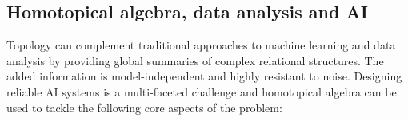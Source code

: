%
%

\subsection{Homotopical algebra, data analysis and AI} \label{ss:ai}

Topology can complement traditional approaches to machine learning and data analysis by providing global summaries of complex relational structures.
The added information is model-independent and highly resistant to noise.
Designing reliable AI systems is a multi-faceted challenge and homotopical algebra can be used to tackle the following core aspects of the problem:

